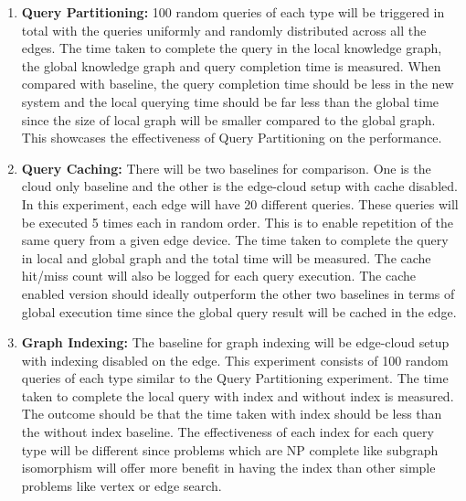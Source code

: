\documentclass[conference]{IEEEtran}
\begin{document}
\begin{enumerate}%
	\item \textbf{Query Partitioning:} 100 random queries of each type will be triggered in total with the queries uniformly and randomly distributed across all the edges. The time taken to complete the query in the local knowledge graph, the global knowledge graph and query completion time is measured. When compared with baseline, the query completion time should be less in the new system and the local querying time should be far less than the global time since the size of local graph will be smaller compared to the global graph. This showcases the effectiveness of Query Partitioning on the performance.
    \item \textbf{Query Caching:} There will be two baselines for comparison. One is the cloud only baseline and the other is the edge-cloud setup with cache disabled. In this experiment, each edge will have 20 different queries. These queries will be executed 5 times each in random order. This is to enable repetition of the same query from a given edge device. The time taken to complete the query in local and global graph and the total time will be measured. The cache hit/miss count will also be logged for each query execution. The cache enabled version should ideally outperform the other two baselines in terms of global execution time since the global query result will be cached in the edge.
    \item \textbf{Graph Indexing:} The baseline for graph indexing will be edge-cloud setup with indexing disabled on the edge. This experiment consists of 100 random queries of each type similar to the Query Partitioning experiment. The time taken to complete the local query with index and without index is measured. The outcome should be that the time taken with index should be less than the without index baseline. The effectiveness of each index for each query type will be different since problems which are NP complete like subgraph isomorphism will offer more benefit in having the index than other simple problems like vertex or edge search.
\end{enumerate}






\end{document}
